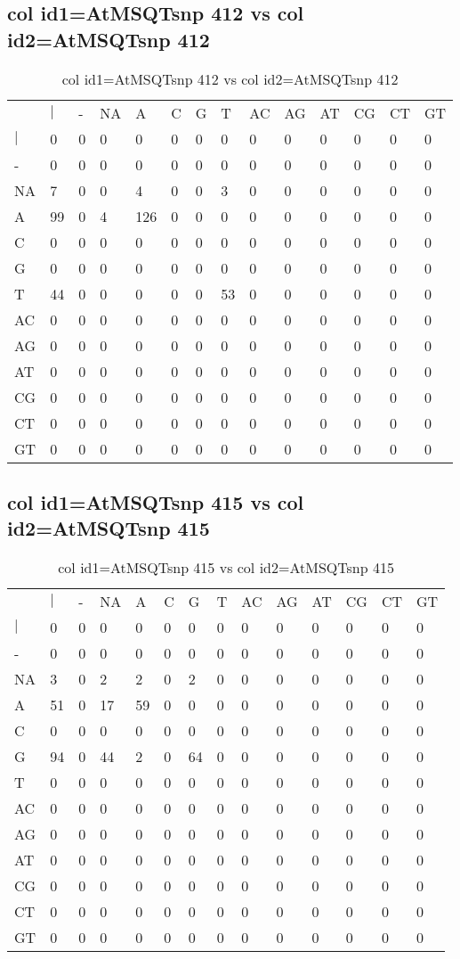 \subsection{col id1=AtMSQTsnp 412 vs col id2=AtMSQTsnp 412}
\begin{center}
\begin{longtable}{|l|l|l|l|l|l|l|l|l|l|l|l|l|l|}
\caption{col id1=AtMSQTsnp 412 vs col id2=AtMSQTsnp 412} \label{table_dm926}\\
\hline
\\
\hline
&$|$&-&NA&A&C&G&T&AC&AG&AT&CG&CT&GT\\
$|$&0&0&0&0&0&0&0&0&0&0&0&0&0\\
-&0&0&0&0&0&0&0&0&0&0&0&0&0\\
NA&7&0&0&4&0&0&3&0&0&0&0&0&0\\
A&99&0&4&126&0&0&0&0&0&0&0&0&0\\
C&0&0&0&0&0&0&0&0&0&0&0&0&0\\
G&0&0&0&0&0&0&0&0&0&0&0&0&0\\
T&44&0&0&0&0&0&53&0&0&0&0&0&0\\
AC&0&0&0&0&0&0&0&0&0&0&0&0&0\\
AG&0&0&0&0&0&0&0&0&0&0&0&0&0\\
AT&0&0&0&0&0&0&0&0&0&0&0&0&0\\
CG&0&0&0&0&0&0&0&0&0&0&0&0&0\\
CT&0&0&0&0&0&0&0&0&0&0&0&0&0\\
GT&0&0&0&0&0&0&0&0&0&0&0&0&0\\
\hline
\end{longtable}
\end{center}

\subsection{col id1=AtMSQTsnp 415 vs col id2=AtMSQTsnp 415}
\begin{center}
\begin{longtable}{|l|l|l|l|l|l|l|l|l|l|l|l|l|l|}
\caption{col id1=AtMSQTsnp 415 vs col id2=AtMSQTsnp 415} \label{table_dm928}\\
\hline
\\
\hline
&$|$&-&NA&A&C&G&T&AC&AG&AT&CG&CT&GT\\
$|$&0&0&0&0&0&0&0&0&0&0&0&0&0\\
-&0&0&0&0&0&0&0&0&0&0&0&0&0\\
NA&3&0&2&2&0&2&0&0&0&0&0&0&0\\
A&51&0&17&59&0&0&0&0&0&0&0&0&0\\
C&0&0&0&0&0&0&0&0&0&0&0&0&0\\
G&94&0&44&2&0&64&0&0&0&0&0&0&0\\
T&0&0&0&0&0&0&0&0&0&0&0&0&0\\
AC&0&0&0&0&0&0&0&0&0&0&0&0&0\\
AG&0&0&0&0&0&0&0&0&0&0&0&0&0\\
AT&0&0&0&0&0&0&0&0&0&0&0&0&0\\
CG&0&0&0&0&0&0&0&0&0&0&0&0&0\\
CT&0&0&0&0&0&0&0&0&0&0&0&0&0\\
GT&0&0&0&0&0&0&0&0&0&0&0&0&0\\
\hline
\end{longtable}
\end{center}

